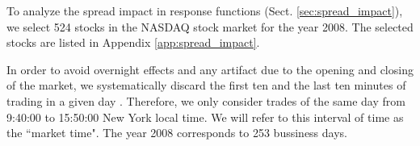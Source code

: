 To analyze the spread impact in response functions (Sect.
\ref{sec:spread_impact}), we select 524 stocks in the NASDAQ stock market for
the year 2008. The selected stocks are listed in Appendix
\ref{app:spread_impact}.

In order to avoid overnight effects and any artifact due to the opening and
closing of the market, we systematically discard the first ten and the last
ten minutes of trading in a given day
\cite{Bouchaud_2004,large_prices_changes,spread_changes_affect,Wang_2016_cross}.
Therefore, we only consider trades of the same day from 9:40:00 to 15:50:00
New York local time. We will refer to this interval of time as the ``market
time". The year 2008 corresponds to 253 bussiness days.
